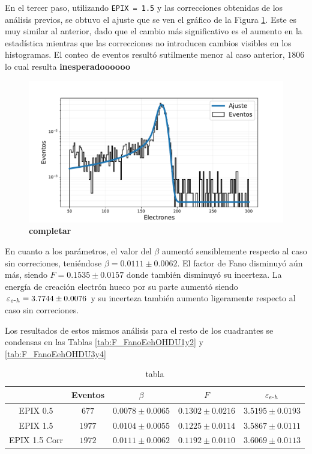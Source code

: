 En el tercer paso, utilizando \verb|EPIX = 1.5| y las correcciones obtenidas de los análisis previos, se obtuvo el ajuste que se ven el gráfico de la Figura \ref{fig:F_OHDU0_EPIX15conCorr}. Este es muy similar al anterior, dado que el cambio más significativo es el aumento en la estadística mientras que las correcciones no introducen cambios visibles en los histogramas. El conteo de eventos resultó sutilmente menor al caso anterior, $1806$ lo cual resulta \textbf{inesperadoooooo}
\begin{figure}[h]
    \centering
        \includegraphics[scale=0.5]{Figs/HistFit_F_EPIX15_OHDU1_Corr.pdf}
    \caption{\footnotesize{\textbf{completar}}}
    \label{fig:F_OHDU0_EPIX15conCorr}
\end{figure}
En cuanto a los parámetros, el valor del $\beta$ aumentó sensiblemente respecto al caso sin correciones, teniéndose $\beta = 0.0111 \pm 0.0062$. El factor de Fano disminuyó aún más, siendo $F = 0.1535 \pm 0.0157$ donde también disminuyó su incerteza. La energía de creación electrón hueco por su parte aumentó siendo $\varepsilon_{e\mbox{-}h} = 3.7744 \pm 0.0076$ y su incerteza también aumento ligeramente respecto al caso sin correciones.

Los resultados de estos mismos análisis para el resto de los cuadrantes se condensas en las Tablas \ref{tab:F_FanoEehOHDU1y2} y \ref{tab:F_FanoEehOHDU3y4}

\begin{table}[H]
\centering
\begin{tabular}{@{}ccccc@{}}
\toprule
                & Eventos                 & $\beta$ & $F$                 & $\varepsilon_{e\mbox{-}h}$ \\ \hline \hline
EPIX 0.5 & $677$ & $0.0078 \pm 0.0065$ & $0.1302 \pm 0.0216$ & $3.5195 \pm 0.0193$  \\
EPIX 1.5 & $1977$ & $0.0104 \pm 0.0055$ & $0.1225 \pm 0.0114$ & $3.5867 \pm 0.0111$\\
EPIX 1.5 Corr & $1972$ & $0.0111 \pm 0.0062$ & $0.1192 \pm 0.0110$ & $3.6069 \pm 0.0113$ \\ \bottomrule
\end{tabular}
\caption{tabla}
\label{tab:F_FanoEehBetaEventos}
\end{table}


